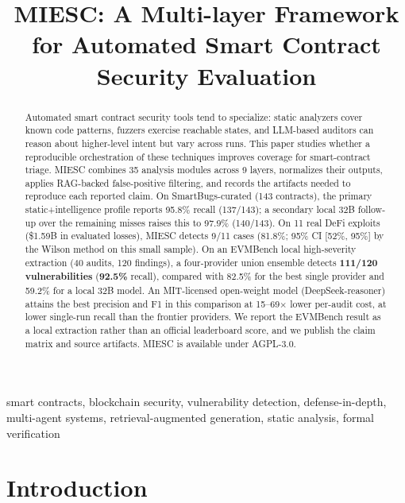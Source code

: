 \documentclass[conference]{IEEEtran}
\begin{document}
\title{MIESC: A Multi-layer Framework for Automated Smart Contract Security Evaluation}

\author{
}

\maketitle

\begin{abstract}
Automated smart contract security tools tend to specialize: static analyzers cover known code patterns, fuzzers exercise reachable states, and LLM-based auditors can reason about higher-level intent but vary across runs. This paper studies whether a reproducible orchestration of these techniques improves coverage for smart-contract triage. MIESC combines 35 analysis modules across 9 layers, normalizes their outputs, applies RAG-backed false-positive filtering, and records the artifacts needed to reproduce each reported claim. On SmartBugs-curated (143 contracts), the primary static+intelligence profile reports 95.8\% recall (137/143); a secondary local 32B follow-up over the remaining misses raises this to 97.9\% (140/143). On 11 real DeFi exploits (\$1.59B in evaluated losses), MIESC detects 9/11 cases (81.8\%; 95\% CI [52\%, 95\%] by the Wilson method on this small sample). On an EVMBench local high-severity extraction (40 audits, 120 findings), a four-provider union ensemble detects \textbf{111/120 vulnerabilities} (\textbf{92.5\%} recall), compared with 82.5\% for the best single provider and 59.2\% for a local 32B model. An MIT-licensed open-weight model (DeepSeek-reasoner) attains the best precision and F1 in this comparison at 15--69$\times$ lower per-audit cost, at lower single-run recall than the frontier providers. We report the EVMBench result as a local extraction rather than an official leaderboard score, and we publish the claim matrix and source artifacts. MIESC is available under AGPL-3.0.
\end{abstract}

\begin{IEEEkeywords}
smart contracts, blockchain security, vulnerability detection, defense-in-depth, multi-agent systems, retrieval-augmented generation, static analysis, formal verification
\end{IEEEkeywords}

\section{Introduction}
\end{document}
